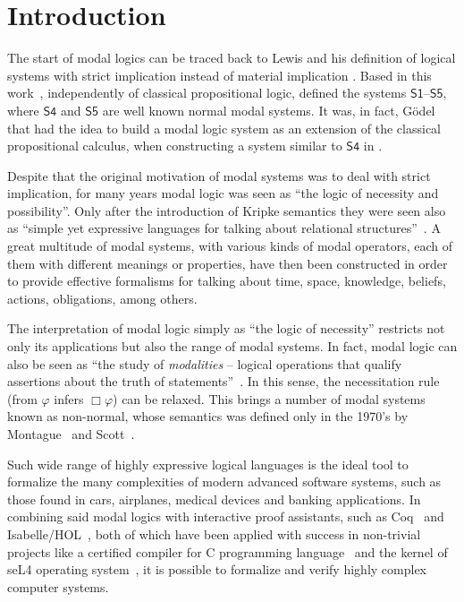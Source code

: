 \documentclass[sigconf]{acmart}
\begin{document}
\maketitle

\section{Introduction}\label{sec:intro}


The start of modal logics can be traced back to Lewis and his definition of 
logical systems with strict implication instead of material implication \cite{Lewis1918}.
Based in this work~\cite{Lewis1932}, independently of classical propositional logic,
defined the systems $\mathsf{S1}$--$\mathsf{S5}$, where $\mathsf{S4}$ and $\mathsf{S5}$
are well known normal modal systems. It was, in fact, G{\"o}del that had the idea 
to build a modal logic system as an extension of the classical propositional calculus, 
when constructing a system similar to $\mathsf{S4}$ in \cite{Godel1933}.

Despite that the original motivation of modal systems was to deal with strict implication, 
for many years modal logic was seen as ``the logic of necessity and possibility''. 
Only after the introduction of Kripke semantics they were seen also as ``simple yet
expressive languages for talking about relational structures''~\cite{Blackburn-ModalLogics}. 
A great multitude of modal systems, with various kinds of modal operators, each of them with 
different meanings or properties, have then been constructed in order to provide effective
formalisms for talking about time, space, knowledge, beliefs, actions, 
obligations, among others.

The interpretation of modal logic simply as ``the logic of necessity'' restricts 
not only its applications but also the range of modal systems. In fact, modal logic 
can also be seen as ``the study of \emph{modalities} -- logical operations that qualify 
assertions about the truth of statements''~\cite{Goldblatt-MathofModality}. In this sense, 
the necessitation rule (from $\varphi$ infers $\Box\varphi$) can be relaxed. This brings 
a number of modal systems known as non-normal, whose semantics was defined only in the 
1970's by Montague~\cite{Montague1970} and Scott~\cite{Scott_AdviceModal1970}.

Such wide range of highly expressive logical languages is the ideal tool to 
formalize the many complexities of modern advanced software systems, 
such as those found in cars, airplanes, medical devices and banking applications.
In combining said modal logics with interactive proof assistants,
such as Coq~\cite{manual_coq} and Isabelle/HOL~\cite{manual_isabelle}, both of
which have been applied with success in non-trivial projects like a certified compiler 
for C programming language~\cite{Leroy09} and the kernel of seL4 operating
system~\cite{Klein10}, it is possible to formalize and verify highly complex computer
systems.
\end{document}
